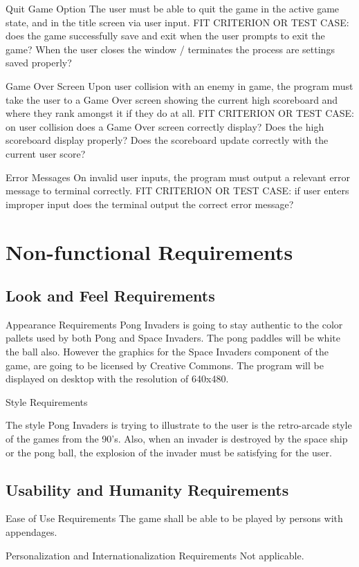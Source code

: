 \documentclass[12pt, titlepage]{article}
\begin{document}
Quit Game Option
The user must be able to quit the game in the active game state, and in the title screen via user input. 
FIT CRITERION OR TEST CASE: does the game successfully save and exit when the user prompts to exit the game? When the user closes the window / terminates the process are settings saved properly?


Game Over Screen
Upon user collision with an enemy in game, the program must take the user to a Game Over screen showing the current high scoreboard and where they rank amongst it if they do at all.
FIT CRITERION OR TEST CASE: on user collision does a Game Over screen correctly display?  Does the high scoreboard display properly? Does the scoreboard update correctly with the current user score?


Error Messages
On invalid user inputs, the program must output a relevant error message to terminal correctly.
FIT CRITERION OR TEST CASE: if user enters improper input does the terminal output the correct error message?
\section{Non-functional Requirements}
\subsection{Look and Feel Requirements}
Appearance Requirements
Pong Invaders is going to stay authentic to the color pallets used by both Pong and Space Invaders. The pong paddles will be white the ball also. However the graphics for the Space Invaders component of the game, are going to be licensed by Creative Commons. The program will be displayed on desktop with the resolution of 640x480.


Style Requirements

The style Pong Invaders is trying to illustrate to the user is the retro-arcade style of the games from the 90’s. Also, when an invader is destroyed by the space ship or the pong ball, the explosion of the invader must be satisfying for the user. 


\subsection{Usability and Humanity Requirements}
Ease of Use Requirements 
The game shall be able to be played by persons with appendages. 

Personalization and Internationalization Requirements
Not applicable. 
\end{document}
